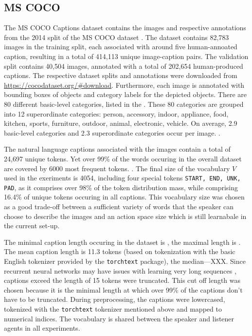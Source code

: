 \subsection{MS COCO}
The MS COCO Captions dataset \parencite{chen2015microsoft} contains the images and respective annotations from the 2014 split of the MS COCO dataset \parencite{lin2014microsoft}. The dataset contains 82,783 images in the training split, each associated with around five human-annoated caption, resulting in a total of 414,113 unique image-caption pairs. The validation split contains 40,504 images, annotated with a total of 202,654 human-produced captions. The respective dataset splits and annotations were downloaded from \url{https://cocodataset.org/#download}.
Furthermore, each image is annotated with bounding boxes of objects and category labels for the depicted objects. There are 80 different basic-level categories, listed in the . These 80 categories are grouped into 12 superordinate categories: person, accessory, indoor, appliance, food, kitchen, sports, furniture, outdoor, animal, electronic, vehicle.
On average, 2.9 basic-level categories and 2.3 superordinate categories occur per image.
.

The natural language captions associated with the images contain a total of 24,697 unique tokens. Yet over 99\% of the words occuring in the overall dataset are covered by 6000 most frequent tokens. . 
The final size of the vocabulary $V$ used in the exeriments is 4054, including four special tokens \texttt{START, END, UNK, PAD}, as it comprises over 98\% of the token distribution mass, while comprising 16.4\% of unique tokens occuring in all captions. This vocabulary size was chosen as a good trade-off between a sufficient variety of words that the speaker can choose to describe the images and an action space size which is still learnabale in the current set-up. 

The minimal caption length occuring in the dataset is , the maximal length is . The mean caption length is 11.3 tokens (based on tokenization with the basic English tokenizer provided by the \texttt{torchtext} package), the median---XXX. Since recurrent neural networks may have issues with learning very long sequences , captions exceed the length of 15 tokens were truncated. This cut off length was chosen because it is the minimal length at which over 99\% of the captions don't have to be truncated. 
During preprocessing, the captions were lowercased, tokenized with the \texttt{torchtext} tokenizer mentioned above and mapped to numerical indices.  The vocabulary is shared between the speaker and listener agents in all experiments. 

